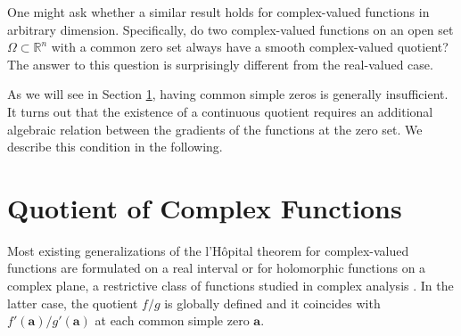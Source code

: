 \documentclass{article}
\newcommand{\COMMENT}[3]{\begingroup\color{#2}\textbf{#1: }#3\endgroup}
\newcommand{\TODO}[1]{\COMMENT{TODO: }{red}{#1}}
\newcommand{\Albert}[1]{{\color[rgb]{0.2,0.4,0.8}\textbf{Albert: } #1}}
\theoremstyle{theorem}
\theoremstyle{definition}
\def\RR{\mathbb{R}}
\def\ba{\mathbf{a}}
\begin{document}
One might ask whether a similar result holds for complex-valued  functions in arbitrary dimension. Specifically, do two complex-valued functions on an open set \(\Omega\subset\RR^n\) with a common zero set always have a smooth complex-valued quotient? The answer to this question is surprisingly different from the real-valued case.

As we will see in Section \ref{sec:RatioOfComplexFunctions}, having common simple zeros is generally insufficient. It turns out that the existence of a continuous quotient requires an additional algebraic relation between the gradients of the functions at the zero set. We describe this condition in the following.



\section{Quotient of Complex Functions}
\label{sec:RatioOfComplexFunctions}

Most existing generalizations of the l'H\^opital theorem for complex-valued functions are formulated on a real interval \cite{Carter:1958:HRC} or for holomorphic functions on a complex plane, a restrictive class of functions studied in complex analysis \cite{AhlforsLars:1979:complex}.
In the latter case, the quotient $f/g$ is globally defined and it coincides with $f'(\ba)/g'(\ba)$ at each common simple zero $\ba$. 
\end{document}
